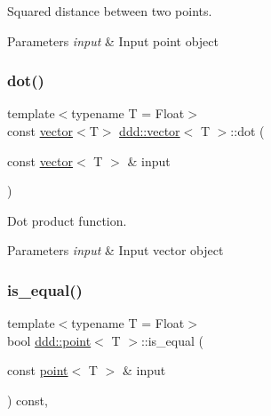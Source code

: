 Squared distance between two points. 


\begin{DoxyParams}{Parameters}
{\em input} & Input point object \\
\hline
\end{DoxyParams}
\mbox{\label{classddd_1_1vector_a61e3ccdb85f4d41c142c80b429808baf}} 
\subsubsection{\texorpdfstring{dot()}{dot()}}
{\footnotesize\ttfamily template$<$typename T = Float$>$ \\
const \hyperlink{classddd_1_1vector}{vector}$<$T$>$ \hyperlink{classddd_1_1vector}{ddd\+::vector}$<$ T $>$\+::dot (\begin{DoxyParamCaption}\item[{const \hyperlink{classddd_1_1vector}{vector}$<$ T $>$ \&}]{input }\end{DoxyParamCaption})\hspace{0.3cm}{\ttfamily [inline]}}



Dot product function. 


\begin{DoxyParams}{Parameters}
{\em input} & Input vector object \\
\hline
\end{DoxyParams}
\mbox{\label{classddd_1_1point_aa4cdbbf16736ee09e840e33f77e94b8a}} 
\subsubsection{\texorpdfstring{is\+\_\+equal()}{is\_equal()}\hspace{0.1cm}{\footnotesize\ttfamily [1/2]}}
{\footnotesize\ttfamily template$<$typename T = Float$>$ \\
bool \hyperlink{classddd_1_1point}{ddd\+::point}$<$ T $>$\+::is\+\_\+equal (\begin{DoxyParamCaption}\item[{const \hyperlink{classddd_1_1point}{point}$<$ T $>$ \&}]{input }\end{DoxyParamCaption}) const\hspace{0.3cm}{\ttfamily [inline]}, {\ttfamily [inherited]}}



